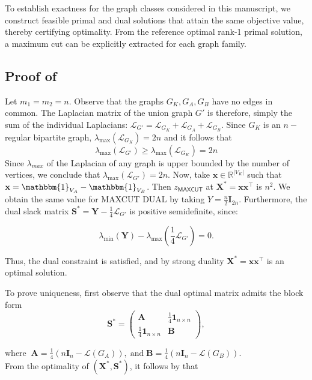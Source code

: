 \documentclass[a4paper,fleqn]{cas-sc}
\newcommand{\R}{\mathbb{R}}
\newcommand{\X}{\mathbf{X}}
\renewcommand{\L}{\mathcal{L}}
\newcommand{\I}{\mathbf{I}}
\newcommand{\1}{\mathbf{1}}
\newcommand{\x}{\mathbf{x}}
\DeclareMathOperator{\mc}{MAXCUT}
\newcommand{\bS}{\mathbf{S}}
\newcommand{\Y}{\mathbf{Y}}
\newcommand{\ind}{\mathbbm{1}}
\begin{document}
To establish exactness for the graph classes considered in this manuscript, we construct feasible primal and dual solutions that attain the same objective value, thereby certifying optimality. From the reference optimal rank-1 primal solution, a maximum cut can be explicitly extracted for each graph family. 

\subsection{Proof of }\label{proof1}
Let $m_1 = m_2 = n$. Observe that the graphs $ G_K,G_{A},G_{B} $  have no edges in common. The Laplacian matrix of the union graph $G'$ is therefore, simply the sum of the individual Laplacians: $\L_{G'} = \L_{G_K} + \L_{G_{A}} + \L_{G_{B}}$. Since $ G_K $ is an $ n-$ regular bipartite graph, $ \lambda_{\max}(\L_{G_K}) = 2n $ and it follows that  
\begin{equation*}
 \lambda_{\max}(\L_{G'}) \geq \lambda_{\max}(\L_{G_K}) = 2n   
\end{equation*}
 Since $\lambda_{max}$ of the Laplacian of any graph is upper bounded by the number of vertices, we conclude that $ \lambda_{\max}(\L_{G'}) = 2n $. Now, take $\x \in \R^{|V_K|}$ such that $\x = \ind_{V_A} - \ind_{V_B}$. Then $z_{\mathsf{\mc}}$ at $ \X^* = \x\x^{\top} $ is $ n^2 $. We obtain the same value for MAXCUT DUAL by taking $ Y = \frac{n}{2} \I_{2n} $. Furthermore, the dual slack matrix $\bS^* = \Y - \frac{1}{4} \L_{G'}$ is positive semidefinite, since: 
 
\begin{equation}\label{dual_feasibilty}
\lambda_{\min} (\Y) - \lambda_{\max} (\frac{1}{4}\L_{G'}) = 0.    
\end{equation}

Thus, the dual constraint is satisfied, and by strong duality $ \X^* = \x\x{^{\top}} $ is an optimal solution.  %

To prove uniqueness, first observe that the dual optimal matrix admits the block form
\[
\bS^* = \begin{pmatrix}
\mathbf{A} & \frac{1}{4}\1_{n \times n} \\[3pt]
\frac{1}{4}\1_{n \times n} & \mathbf{B}
\end{pmatrix},\]

$\text{where} \; \; 
\mathbf{A}=\tfrac14(n \I_n-\L(G_A)), \; \text{and} \;
\mathbf{B}=\tfrac14(n\I_n-\L(G_B))$.\\

From the optimality of $(\X^*, \bS^*)$, it follows by  that
\end{document}

